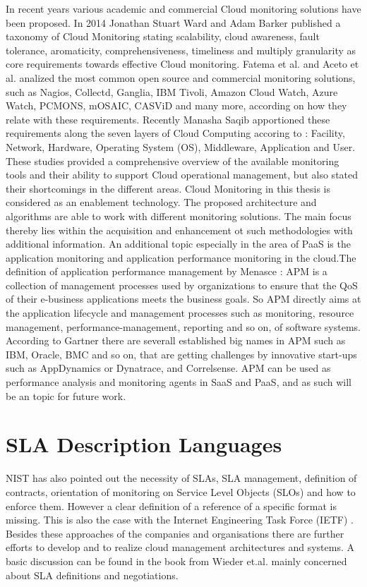 In recent years various academic and commercial Cloud monitoring solutions have been proposed. In 2014 Jonathan Stuart Ward and Adam Barker \cite{ward2014observing} published a taxonomy of Cloud Monitoring stating scalability, cloud awareness, fault tolerance, aromaticity, comprehensiveness, timeliness and multiply granularity as core requirements towards effective Cloud monitoring. Fatema et al. \cite{fatema2014survey} and Aceto et al. \cite{aceto2013cloud} analized the most common open source and commercial monitoring solutions, such as Nagios, Collectd, Ganglia, IBM Tivoli, Amazon Cloud Watch, Azure Watch, PCMONS, mOSAIC, CASViD and many more, according on how they relate with these requirements. Recently Manasha Saqib \cite{saqib2017cloud} apportioned these requirements along the seven layers of Cloud Computing accoring to \cite{CSA3.0} \cite{spring2011monitoring1} \cite{spring2011monitoring2}: Facility, Network, Hardware, Operating System (OS), Middleware, Application and User. These studies provided a comprehensive overview of the available monitoring tools and their ability to support Cloud operational management, but also stated their shortcomings in the different areas. Cloud Monitoring in this thesis is considered as an enablement technology. The proposed architecture and algorithms are able to work with different monitoring solutions. The main focus thereby lies within the acquisition and enhancement ot such methodologies with additional information.
An additional topic especially in the area of PaaS is the application monitoring and application performance monitoring in the cloud.The definition of application performance management by Menasce \cite{menasce2002load}: APM is a collection of management processes used by organizations to ensure that the QoS of their e-business applications meets the business goals. So APM directly aims at the application lifecycle and management processes such as monitoring, resource management, performance-management, reporting and so on, of software systems. According to Gartner \cite{GartnerAPM} there are severall established big names in APM such as IBM, Oracle, BMC and so on, that are getting challenges by innovative start-ups such as AppDynamics or Dynatrace, and Correlsense. APM can be used as performance analysis and monitoring agents in SaaS and PaaS, and as such will be an topic for future work.


\section{SLA Description Languages}
NIST \cite{Liu2011} has also pointed out the necessity of SLAs, SLA management, definition of contracts, orientation of monitoring on Service Level Objects (SLOs) and how to enforce them. However a clear definition of a reference of a specific format is missing. This is also the case with the Internet Engineering Task Force (IETF) \cite{Khasnabish2010}. Besides these approaches of the companies and organisations there are further efforts to develop and to realize cloud management architectures and systems. A basic discussion can be found in the book from Wieder et.al. \cite{Wieder2011} mainly concerned about SLA definitions and negotiations.

